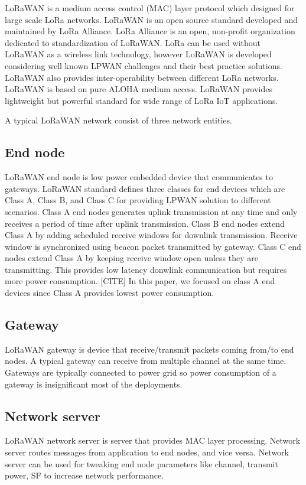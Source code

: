 \documentclass[conference]{IEEEtran}
\begin{document}
\par LoRaWAN is a medium access control (MAC) layer protocol which designed for large scale LoRa networks. LoRaWAN is an open source standard developed and maintained by LoRa Alliance. LoRa Alliance is an open, non-profit organization dedicated to standardization of LoRaWAN. LoRa can be used without LoRaWAN as a wireless link technology, however LoRaWAN is developed considering well known LPWAN challenges and their best practice solutions. LoRaWAN also provides inter-operability between different LoRa networks. LoRaWAN is based on pure ALOHA medium access. LoRaWAN provides lightweight but powerful standard for wide range of LoRa IoT applications.

\par A typical LoRaWAN network consist of three network entities.

\subsection{End node}
\par LoRaWAN end node is low power embedded device that communicates to gateways. LoRaWAN standard defines three classes for end devices which are Class A, Class B, and Class C for providing LPWAN solution to different scenarios. Class A end nodes generates uplink transmission at any time and only receives a period of time after uplink transmission. Class B end nodes extend Class A by adding scheduled receive windows for downlink transmission. Receive window is synchronized using beacon packet transmitted by gateway. Class C end nodes extend Class A by keeping receive window open unless they are transmitting. This provides low latency donwlink communication but requires more power consumption. [CITE] In this paper, we focused on class A end devices since Class A provides lowest power consumption.

\subsection{Gateway}
\par LoRaWAN gateway is device that receive/transmit packets coming from/to end nodes. A typical gateway can receive from multiple channel at the same time. Gateways are typically connected to power grid so power consumption of a gateway is insignificant most of the deployments.

\subsection{Network server}
\par LoRaWAN network server is server that provides MAC layer processing. Network server routes messages from application to end nodes, and vice versa. Network server can be used for tweaking end node parameters like channel, transmit power, SF to increase network performance.  
\end{document}
